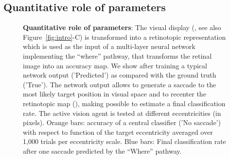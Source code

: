 \subsection{Quantitative role of parameters}
\begin{figure}[t!]%
\caption{
{\bf Quantitative role of parameters}:
\A The visual display (\DIS , see also  Figure~\ref{fig:intro}-C)  is transformed into a retinotopic representation which is used as the input of a multi-layer neural network implementing the ``where'' pathway, that transforms the retinal image into an accuracy map. %
\B We show after training a typical network output  ('Predicted') as compared  with the ground truth ('True'). %
\C The network output allows to generate a saccade to the most likely target position in visual space and to recenter the retinotopic map (\SAC ), making possible to estimate a final classification rate. %
\D The active vision agent is tested at different eccentricities (in pixels). Orange bars: accuracy of a central classifier ('No saccade') with respect to  function of the target eccentricity averaged over 1,000 trials per eccentricity scale. Blue bars: Final classification rate after one saccade predicted by the ``Where'' pathway.
\label{fig:params}}%
\end{figure}%
